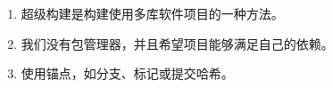 

\begin{enumerate}
\item 
超级构建是构建使用多库软件项目的一种方法。

\item
我们没有包管理器，并且希望项目能够满足自己的依赖。

\item 
使用锚点，如分支、标记或提交哈希。
\end{enumerate}